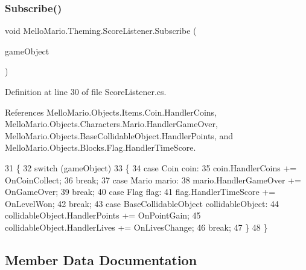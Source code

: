 \mbox{\label{classMelloMario_1_1Theming_1_1ScoreListener_a01b09ec4dffdfb5b1bf00d31420c702c}} 
\subsubsection{Subscribe()\hspace{0.1cm}{\footnotesize\ttfamily [2/2]}}
{\footnotesize\ttfamily void Mello\+Mario.\+Theming.\+Score\+Listener.\+Subscribe (\begin{DoxyParamCaption}\item[{\textbf{ I\+Game\+Object}}]{game\+Object }\end{DoxyParamCaption})}



Definition at line 30 of file Score\+Listener.\+cs.



References Mello\+Mario.\+Objects.\+Items.\+Coin.\+Handler\+Coins, Mello\+Mario.\+Objects.\+Characters.\+Mario.\+Handler\+Game\+Over, Mello\+Mario.\+Objects.\+Base\+Collidable\+Object.\+Handler\+Points, and Mello\+Mario.\+Objects.\+Blocks.\+Flag.\+Handler\+Time\+Score.


\begin{DoxyCode}
31         \{
32             \textcolor{keywordflow}{switch} (gameObject)
33             \{
34                 \textcolor{keywordflow}{case} Coin coin:
35                     coin.HandlerCoins += OnCoinCollect;
36                     \textcolor{keywordflow}{break};
37                 \textcolor{keywordflow}{case} Mario mario:
38                     mario.HandlerGameOver += OnGameOver;
39                     \textcolor{keywordflow}{break};
40                 \textcolor{keywordflow}{case} Flag flag:
41                     flag.HandlerTimeScore += OnLevelWon;
42                     \textcolor{keywordflow}{break};
43                 \textcolor{keywordflow}{case} BaseCollidableObject collidableObject:
44                     collidableObject.HandlerPoints += OnPointGain;
45                     collidableObject.HandlerLives += OnLivesChange;
46                     \textcolor{keywordflow}{break};
47             \}
48         \}
\end{DoxyCode}


\subsection{Member Data Documentation}
\mbox{\label{classMelloMario_1_1Theming_1_1ScoreListener_a725cbbe74fd20bc5bb745a1be7354cbf}} 
